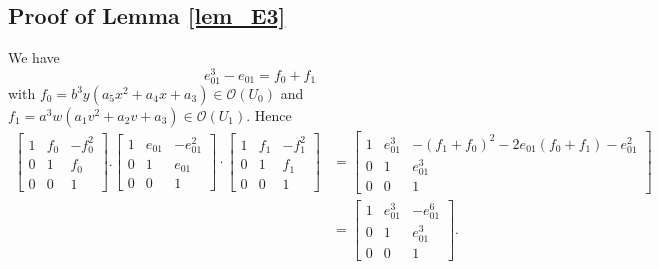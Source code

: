 \documentclass[12pt,a4]{amsart}
\theoremstyle{definition}
\begin{document}
\begin{appendix}
\subsection{Proof of Lemma \ref{lem_E3}}\label{proof_4}
We have 
$$e_{01}^3-e_{01} = f_0+f_1$$ with 
$f_0 = b^3y(a_5x^2+a_4x+a_3) \in \mathcal{O}(U_0)$ and 
$f_1 = a^3w(a_1v^2+a_2v+a_3) \in \mathcal{O}(U_1).$ 
Hence
\begin{align*}
  \begin{bmatrix}
1 & f_0 & -f_0^2 \\  0 & 1 & f_0 \\ 0 & 0 & 1
\end{bmatrix} . \begin{bmatrix}
1 & e_{01} & -e_{01}^2 \\  0 & 1 & e_{01} \\ 0 & 0 & 1
\end{bmatrix}\cdot \begin{bmatrix}
1 & f_1 & -f_{1}^2 \\  0 & 1 & f_{1} \\ 0 & 0 & 1
\end{bmatrix}  
%
&
= \begin{bmatrix}
1 & e_{01}^3 & -(f_1+f_0)^2 - 2e_{01}(f_0+f_1) - e_{01}^2 \\  0 & 1 & e_{01}^3 \\ 0 & 0 & 1
\end{bmatrix} \\
&=  \begin{bmatrix}
1 & e_{01}^3 & -e_{01}^6 \\  0 & 1 & e_{01}^3 \\ 0 & 0 & 1
\end{bmatrix}. 
\end{align*}

\end{appendix}
\end{document}
